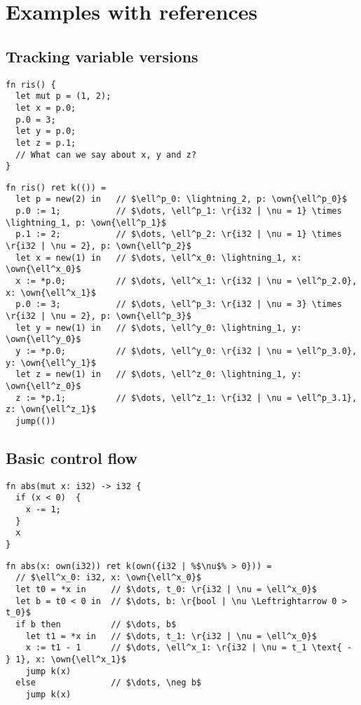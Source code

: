 \documentclass{article}
\newcommand{\own}[1]{\mathbf{own}\left(#1\right)}
\begin{document}
\newpage
\section{Examples with references}

\subsection{Tracking variable versions}
\begin{verbatim}
fn ris() {
  let mut p = (1, 2);
  let x = p.0;
  p.0 = 3;
  let y = p.0;
  let z = p.1;
  // What can we say about x, y and z?
}
\end{verbatim}

\begin{verbatim}
fn ris() ret k(()) =
  let p = new(2) in   // $\ell^p_0: \lightning_2, p: \own{\ell^p_0}$
  p.0 := 1;           // $\dots, \ell^p_1: \r{i32 | \nu = 1} \times \lightning_1, p: \own{\ell^p_1}$
  p.1 := 2;           // $\dots, \ell^p_2: \r{i32 | \nu = 1} \times \r{i32 | \nu = 2}, p: \own{\ell^p_2}$
  let x = new(1) in   // $\dots, \ell^x_0: \lightning_1, x: \own{\ell^x_0}$
  x := *p.0;          // $\dots, \ell^x_1: \r{i32 | \nu = \ell^p_2.0}, x: \own{\ell^x_1}$
  p.0 := 3;           // $\dots, \ell^p_3: \r{i32 | \nu = 3} \times \r{i32 | \nu = 2}, p: \own{\ell^p_3}$
  let y = new(1) in   // $\dots, \ell^y_0: \lightning_1, y: \own{\ell^y_0}$
  y := *p.0;          // $\dots, \ell^y_0: \r{i32 | \nu = \ell^p_3.0}, y: \own{\ell^y_1}$
  let z = new(1) in   // $\dots, \ell^z_0: \lightning_1, y: \own{\ell^z_0}$
  z := *p.1;          // $\dots, \ell^z_1: \r{i32 | \nu = \ell^p_3.1}, z: \own{\ell^z_1}$
  jump(())
\end{verbatim}

\subsection{Basic control flow}

\begin{verbatim}
fn abs(mut x: i32) -> i32 {
  if (x < 0)  {
    x -= 1;
  }
  x
}
\end{verbatim}

\begin{verbatim}
fn abs(x: own(i32)) ret k(own({i32 | %$\nu$% > 0})) =
  // $\ell^x_0: i32, x: \own{\ell^x_0}$
  let t0 = *x in     // $\dots, t_0: \r{i32 | \nu = \ell^x_0}$
  let b = t0 < 0 in  // $\dots, b: \r{bool | \nu \Leftrightarrow 0 > t_0}$
  if b then          // $\dots, b$
    let t1 = *x in   // $\dots, t_1: \r{i32 | \nu = \ell^x_0}$
    x := t1 - 1      // $\dots, \ell^x_1: \r{i32 | \nu = t_1 \text{ - } 1}, x: \own{\ell^x_1}$
    jump k(x)
  else               // $\dots, \neg b$
    jump k(x)
\end{verbatim}
\end{document}
